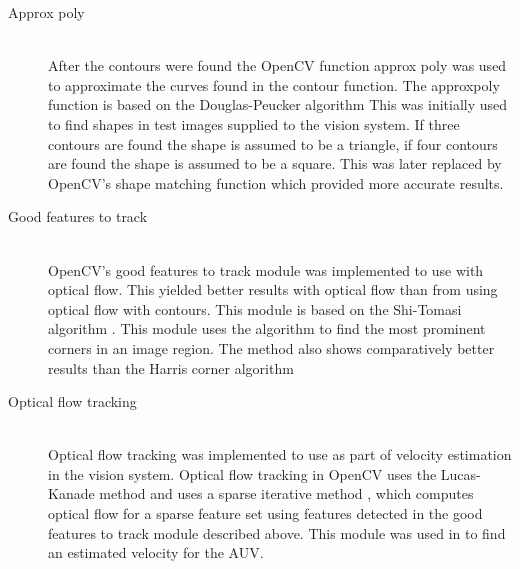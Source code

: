 \begin{description}
\item[Approx poly]\hfill \\
After the contours were found the OpenCV function approx poly was used to approximate the curves found in the contour function. The approxpoly function is based on the Douglas-Peucker algorithm \cite{article:douglas}
This was initially used to find shapes in test images supplied to the vision system. If three contours are found the shape is assumed to be a triangle, if four contours are found the shape is assumed to be a square. This was later replaced by OpenCV's shape matching function which provided more accurate results.

\item[Good features to track]\hfill \\
OpenCV's good features to track module was implemented to use with optical flow. This yielded better results with optical flow than from using optical flow with contours. This module is based on the Shi-Tomasi algorithm \cite{article:tomasi}. This module uses the algorithm to find the most prominent corners in an image region. The method also shows comparatively better results than the Harris corner algorithm \cite{article:tomasi}

\item[Optical flow tracking]\hfill \\
Optical flow tracking was implemented to use as part of velocity estimation in the vision system. Optical flow tracking in OpenCV uses the Lucas-Kanade method and uses a sparse iterative method \cite{web:opticalFlow}, which computes optical flow for a sparse feature set using features detected in the good features to track module described above. This module was used in to find an estimated velocity for the AUV.

\end{description}

